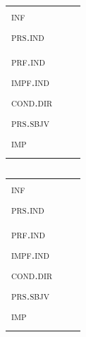 \begin{table}
	\caption{}

	\begin{tabular}{lll}
		\lsptoprule
		\\
		\midrule
		\textsc{inf} & \\
		\textsc{prs.ind} & \\
		& \\
		\textsc{prf.ind} & \\
		\textsc{impf.ind} & \\
		\textsc{cond.dir} & \\
		\textsc{prs.sbjv}	&\\
		\textsc{imp}	& \\
		\lspbottomrule
	\end{tabular}
\end{table}
\textsc{}

\begin{table}
	\caption{}

	\begin{tabular}{lll}
		\lsptoprule
		\\
		\midrule
		\textsc{inf} & \\
		\textsc{prs.ind} & \\
		& \\
		\textsc{prf.ind} & \\
		\textsc{impf.ind} & \\
		\textsc{cond.dir} & \\
		\textsc{prs.sbjv}	&\\
		\textsc{imp}	& \\
		\lspbottomrule
	\end{tabular}
\end{table}



